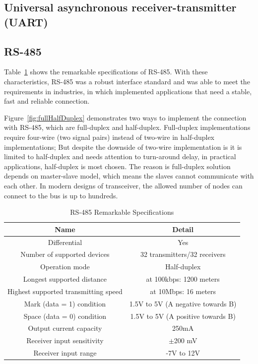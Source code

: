   \subsection{Universal asynchronous receiver-transmitter (UART)}
  
  \subsection{RS-485}
  Table~\ref{table:RS-485HighLightSpecs} shows the remarkable specifications of RS-485. With these characteristics, RS-485 was a robust interface standard and was able to meet the requirements in industries, in which implemented applications that need a stable, fast and reliable connection. 
  
  Figure~\ref{fig:fullHalfDuplex} demonstrates two ways to implement the connection with RS-485, which are full-duplex and half-duplex. Full-duplex implementations require four-wire (two signal pairs) instead of two-wire in half-duplex implementations; But despite the downside of two-wire implementation is it is limited to half-duplex and needs attention to turn-around delay, in practical applications, half-duplex is most chosen. The reason is full-duplex solution depends on master-slave model, which means the slaves cannot communicate with each other. In modern designs of transceiver, the allowed number of nodes can connect to the bus is up to hundreds.
    \begin{table}[h!]
      \begin{center}
      \begin{tabular}{ |c||c|  }
        \hline
        Name & Detail\\
        \hline
        Differential&   Yes\\
        Number of supported devices&   32 transmitters/32 receivers\\
        Operation mode & Half-duplex\\
        Longest supported distance & at 100kbps: 1200 meters\\
        Highest supported transmitting speed& at 10Mbps: 16 meters\\
        Mark (data = 1) condition& 1.5V to 5V (A negative towards B)\\
        Space (data = 0) condition& 1.5V to 5V (A positive towards B)\\
        Output current capacity& 250mA\\
        Receiver input sensitivity& $\pm$200 mV\\
        Receiver input range& -7V to 12V\\        
        \hline
       \end{tabular}
       \caption{RS-485 Remarkable Specifications}
       \label{table:RS-485HighLightSpecs}
      \end{center}
      \end{table}
    
